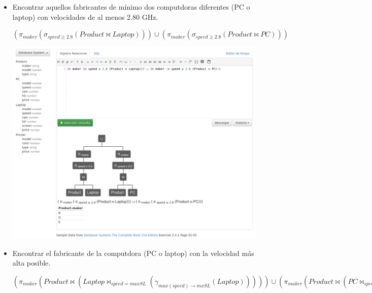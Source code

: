 \documentclass[12pt, letterpaper]{article}
\begin{document}
\begin{itemize}
\begin{itemize}
                \newpage

                \item[\textbf{i.}]  Encontrar aquellos fabricantes de mínimo dos 
                                    computdoras diferentes (PC o laptop) con 
                                    velocidades de al menos 2.80 GHz.

                                    \begin{center}
                                        $(\pi_{maker}(\sigma_{speed \geq 2.8}(Product \Join Laptop))) \cup (\pi_{maker}(\sigma_{speed\geq 2.8}(Product \Join PC)))$ \vspace{.3cm}

                                        \includegraphics[scale=0.25]{i.png}
                                    \end{center}

                \item[\textbf{j.}]  Encontrar el fabricante de la computdora 
                                    (PC o laptop) con la velocidad más alta 
                                    posible. 

                                    \begin{center}
                                        $(\pi_{maker}(Product \Join (Laptop \Join_{speed = maxSL} (\gamma_{max(speed)\rightarrow mxSL}(Laptop))))) \cup 
                                        (\pi_{maker}(Product \Join (PC \Join_{speed = maxSP} (\gamma_{max(speed)\rightarrow mxSP}(PC)))))$ \vspace{.3cm}


\end{center}
\end{itemize}
\end{itemize}
\end{document}
